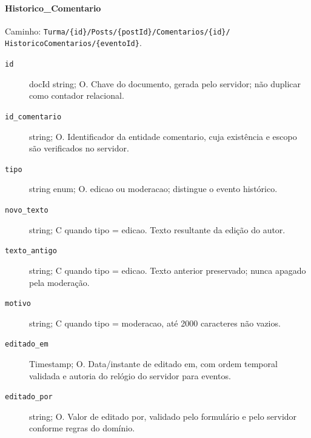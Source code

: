 \paragraph{Historico\_Comentario}\mbox{}\par
Caminho: \texttt{Turma/\{id\}/Posts/\{postId\}/Comentarios/\{id\}/}
\texttt{HistoricoComentarios/\{eventoId\}}.
\begin{description}
\item[\texttt{id}] docId string; O. Chave do documento, gerada pelo servidor; não duplicar como contador relacional.
\item[\texttt{id\_comentario}] string; O. Identificador da entidade comentario, cuja existência e escopo são verificados no servidor.
\item[\texttt{tipo}] string enum; O. edicao ou moderacao; distingue o evento histórico.
\item[\texttt{novo\_texto}] string; C quando tipo = edicao. Texto resultante da edição do autor.
\item[\texttt{texto\_antigo}] string; C quando tipo = edicao. Texto anterior preservado; nunca apagado pela moderação.
\item[\texttt{motivo}] string; C quando tipo = moderacao, até 2000 caracteres não vazios.
\item[\texttt{editado\_em}] Timestamp; O. Data/instante de editado em, com ordem temporal validada e autoria do relógio do servidor para eventos.
\item[\texttt{editado\_por}] string; O. Valor de editado por, validado pelo formulário e pelo servidor conforme regras do domínio.
\end{description}

